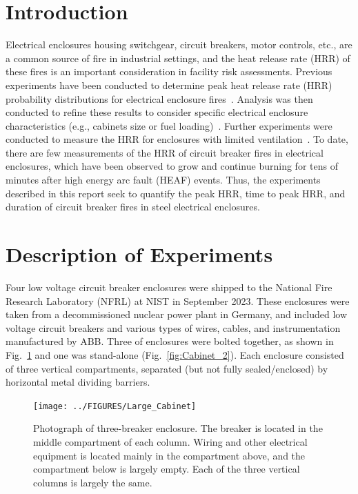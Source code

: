 \documentclass[12pt]{article}
\begin{document}
\pagebreak


\section{Introduction}

Electrical enclosures housing switchgear, circuit breakers, motor controls, etc., are a common source of fire in industrial settings, and the heat release rate (HRR) of these fires is an important consideration in facility risk assessments. Previous experiments have been conducted to determine peak heat release rate (HRR) probability distributions for electrical enclosure fires~\cite{NUREG/CR-7197}. Analysis was then conducted to refine these results to consider specific electrical enclosure characteristics (e.g., cabinets size or fuel loading)~\cite{NUREG-2178}. Further experiments were conducted to measure the HRR for enclosures with limited ventilation~\cite{OLIVE-FIRE}. To date, there are few measurements of the HRR of circuit breaker fires in electrical enclosures, which have been observed to grow and continue burning for tens of minutes after high energy arc fault (HEAF) events. Thus, the experiments described in this report seek to quantify the peak HRR, time to peak HRR, and duration of circuit breaker fires in steel electrical enclosures.


\section{Description of Experiments}

Four low voltage circuit breaker enclosures were shipped to the National Fire Research Laboratory (NFRL) at NIST in September 2023. These enclosures were taken from a decommissioned nuclear power plant in Germany, and included low voltage circuit breakers and various types of wires, cables, and instrumentation manufactured by ABB. Three of enclosures were bolted together, as shown in Fig.~\ref{fig:Cabinet_1} and one was stand-alone (Fig.~\ref{fig:Cabinet_2}). Each enclosure consisted of three vertical compartments, separated (but not fully sealed/enclosed) by horizontal metal dividing barriers.

\begin{figure}[ht]
\centering
\texttt{[image: ../FIGURES/Large\_Cabinet]}
\caption[Photograph of three-breaker enclosure] {Photograph of three-breaker enclosure. The breaker is located in the middle compartment of each column. Wiring and other electrical equipment is located mainly in the compartment above, and the compartment below is largely empty. Each of the three vertical columns is largely the same.}
\label{fig:Cabinet_1}
\end{figure}
\end{document}
